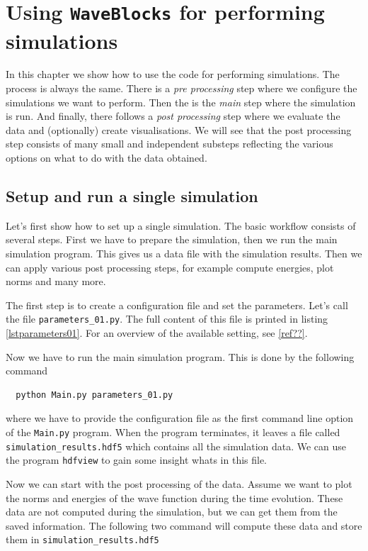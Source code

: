 \documentclass[a4paper,10pt]{report}
\begin{document}
\chapter{Using \texttt{WaveBlocks} for performing simulations}

In this chapter we show how to use the code for performing simulations. The process
is always the same. There is a \emph{pre processing} step where we configure the
simulations we want to perform. Then the is the \emph{main} step where the simulation
is run. And finally, there follows a \emph{post processing} step where we evaluate
the data and (optionally) create visualisations. We will see that the post processing
step consists of many small and independent substeps reflecting the various options
on what to do with the data obtained.

\section{Setup and run a single simulation}

Let's first show how to set up a single simulation. The basic workflow consists of
several steps. First we have to prepare the simulation, then we run the main simulation
program. This gives us a data file with the simulation results. Then we can apply various
post processing steps, for example compute energies, plot norms and many more.

The first step is to create a configuration file and set the parameters. Let's
call the file \texttt{parameters\_01.py}. The full content of this file is printed
in listing \ref{lstparameters01}. For an overview of the available setting, see \ref{ref??}.

Now we have to run the main simulation program. This is done by the following command

\begin{verbatim}
  python Main.py parameters_01.py
\end{verbatim}

where we have to provide the configuration file as the first command line option
of the \texttt{Main.py} program. When the program terminates, it leaves a file
called \texttt{simulation\_results.hdf5} which contains all the simulation data.
We can use the program \texttt{hdfview} to gain some insight whats in this file.

Now we can start with the post processing of the data. Assume we want to plot
the norms and energies of the wave function during the time evolution. These data
are not computed during the simulation, but we can get them from the saved
information. The following two command will compute these data and store them
in \texttt{simulation\_results.hdf5}
\end{document}
